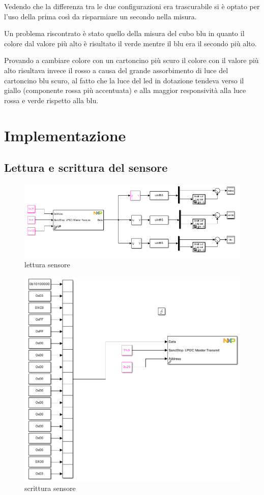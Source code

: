 \documentclass[12pt]{report}
\begin{document}
Vedendo che la differenza tra le due configurazioni era trascurabile si è optato per l'uso della prima così da risparmiare un secondo nella misura.

Un problema riscontrato è stato quello della misura del cubo blu in quanto il colore dal valore più alto è risultato il verde mentre il blu era il secondo più alto. 

Provando a cambiare colore con un cartoncino più scuro il colore con il valore più alto risultava invece il rosso a causa del grande assorbimento di luce del cartoncino blu scuro, al fatto che la 
luce del led in dotazione tendeva verso il giallo (componente rossa più accentuata) e alla maggior responsività alla luce rossa e verde rispetto alla blu.

\section{Implementazione}

\subsection{Lettura e scrittura del sensore}

\begin{figure}[H] 
    \centering
    \includegraphics[width=0.76\linewidth]{images/Immagini sensore/lettura sensore.png}
    \caption{lettura sensore}
\end{figure}

\begin{figure}[H]
    \centering
    \includegraphics[width=0.6\linewidth]{images/Immagini sensore/scrittura sensore.png}
    \caption{scrittura sensore}
\end{figure}
\end{document}
